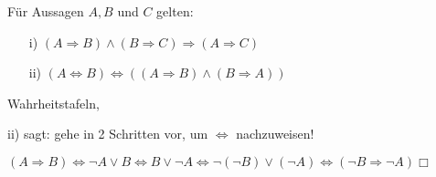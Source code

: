 \begin{prop}
	Für Aussagen $A,B$ und $C$ gelten:
	\begin{itemize}
		\item[i)] $(A\Rightarrow B)\wedge(B\Rightarrow C)\Rightarrow(A\Rightarrow C)$
		\item[ii)] $(A\Leftrightarrow B)\Leftrightarrow((A\Rightarrow B)\wedge(B\Rightarrow A))$
	\end{itemize}
\end{prop}

\begin{bew}
	Wahrheitstafeln,
\end{bew}

\begin{inter}
	ii) sagt: gehe in 2 Schritten vor, um $\Leftrightarrow$ nachzuweisen!
\end{inter}

\begin{bew}[von 0.4ii)]
	$(A\Rightarrow B) \Leftrightarrow \neg A\vee B \Leftrightarrow B\vee\neg A \Leftrightarrow \neg(\neg B)\vee(\neg A) \Leftrightarrow (\neg B \Rightarrow \neg A)$\hfill $\Box$
\end{bew}